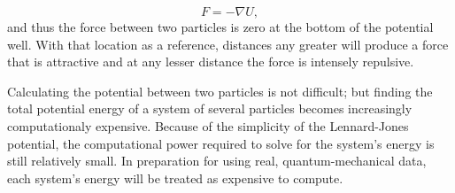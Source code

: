 \begin{equation} \label{eq:forceEq}
F = -\nabla U,
\end{equation}
and thus the force between two particles is zero at the bottom of the potential well. With that location as a reference, distances any greater will produce a force that is attractive and at any lesser distance the force is intensely repulsive.

\par Calculating the potential between two particles is not difficult; but finding the total potential energy of a system of several particles becomes increasingly computationaly expensive. Because of the simplicity of the Lennard-Jones potential, the computational power required to solve for the system's energy is still relatively small. In preparation for using real, quantum-mechanical data, each system's energy will be treated as expensive to compute. 



